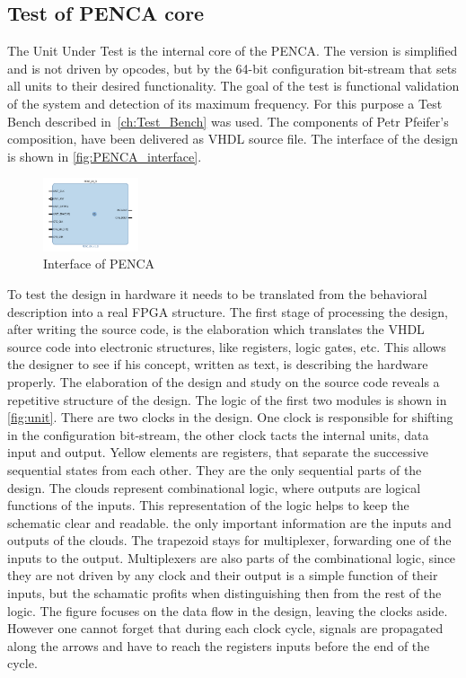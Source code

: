 \subsection{Test of PENCA core}
The Unit Under Test is the internal core of the PENCA. The version is simplified and is not driven by opcodes, but by the 64-bit configuration bit-stream that sets all units to their desired functionality. The goal of the test is functional validation of the system and detection of its maximum frequency. For this purpose a Test Bench described in~\autoref{ch:Test_Bench} was used.
The components of Petr Pfeifer's composition, have been delivered as VHDL source file. The interface of the design is shown in \autoref{fig:PENCA_interface}.

\begin{figure}[h]
\centering
\includegraphics[width=0.25\textwidth]{figures/PENCA_interface.PNG}
\caption{Interface of PENCA}
\label{fig:PENCA_interface}
\end{figure}

To test the design in hardware it needs to be translated from the behavioral description into a real FPGA structure. The first stage of processing the design, after writing the source code, is the elaboration which translates the VHDL source code into electronic structures, like registers, logic gates, etc. This allows the designer to see if his concept, written as text, is describing the hardware properly.
The elaboration of the design and study on the source code reveals a repetitive structure of the design. The logic of the first two modules is shown in \autoref{fig:unit}. There are two clocks in the design. One clock is responsible for shifting in the configuration bit-stream, the other clock tacts the internal units, data input and output. Yellow elements are registers, that separate the successive sequential states from each other. They are the only sequential parts of the design. The clouds represent combinational logic, where outputs are logical functions of the inputs. This representation of the logic helps to keep the schematic clear and readable. the only important information are the inputs and outputs of the clouds. The trapezoid stays for multiplexer, forwarding one of the inputs to the output. Multiplexers are also parts of the combinational logic, since they are not driven by any clock and their output is a simple function of their inputs, but the schamatic profits when distinguishing then from the rest of the logic. The figure focuses on the data flow in the design, leaving the clocks aside. However one cannot forget that during each clock cycle, signals are propagated along the arrows and have to reach the registers inputs before the end of the cycle.

